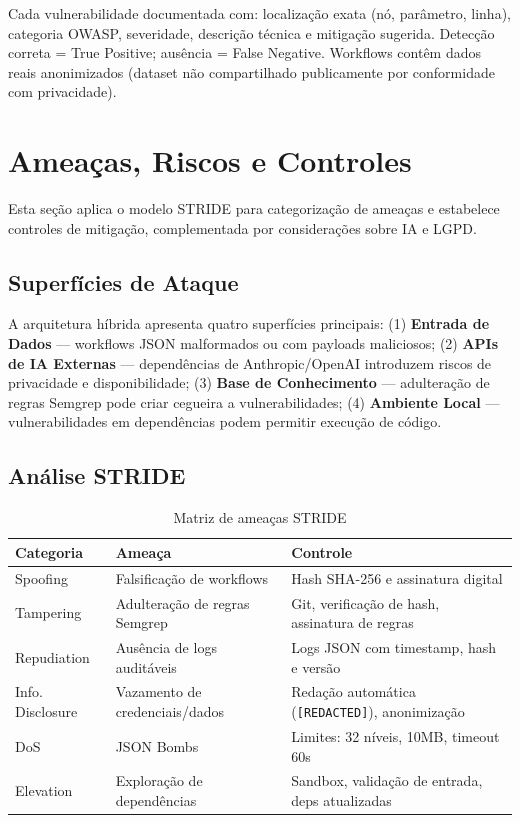 \documentclass[12pt,a4paper]{article}
\begin{document}
Cada vulnerabilidade documentada com: localização exata (nó, parâmetro, linha), categoria OWASP, severidade, descrição técnica e mitigação sugerida. Detecção correta = True Positive; ausência = False Negative. Workflows contêm dados reais anonimizados (dataset não compartilhado publicamente por conformidade com privacidade).

\section{Ameaças, Riscos e Controles}
\label{sec:threat-model}

Esta seção aplica o modelo STRIDE para categorização de ameaças e estabelece controles de mitigação, complementada por considerações sobre IA e LGPD.

\subsection{Superfícies de Ataque}

A arquitetura híbrida apresenta quatro superfícies principais: (1) \textbf{Entrada de Dados} — workflows JSON malformados ou com payloads maliciosos; (2) \textbf{APIs de IA Externas} — dependências de Anthropic/OpenAI introduzem riscos de privacidade e disponibilidade; (3) \textbf{Base de Conhecimento} — adulteração de regras Semgrep pode criar cegueira a vulnerabilidades; (4) \textbf{Ambiente Local} — vulnerabilidades em dependências podem permitir execução de código.

\subsection{Análise STRIDE}

\begin{table}[H]
\centering \small
\caption{Matriz de ameaças STRIDE}
\label{tab:stride}
\begin{tabular}{@{}p{1.8cm}p{4.5cm}p{5.5cm}@{}}
\toprule
\textbf{Categoria} & \textbf{Ameaça} & \textbf{Controle} \\ \midrule
Spoofing & Falsificação de workflows & Hash SHA-256 e assinatura digital \\
Tampering & Adulteração de regras Semgrep & Git, verificação de hash, assinatura de regras \\
Repudiation & Ausência de logs auditáveis & Logs JSON com timestamp, hash e versão \\
Info. Disclosure & Vazamento de credenciais/dados & Redação automática (\texttt{[REDACTED]}), anonimização \\
DoS & JSON Bombs & Limites: 32 níveis, 10MB, timeout 60s \\
Elevation & Exploração de dependências & Sandbox, validação de entrada, deps atualizadas \\
\bottomrule
\end{tabular}
\end{table}
\end{document}
